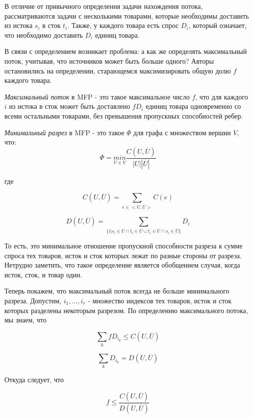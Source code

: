\documentclass[12pt]{article} %
\begin{document}
В отличие от привычного определения задачи нахождения потока, рассматриваются задачи с несколькими товарами, которые необходимы доставить из истока $s_i$ в сток $t_i$. Также, у каждого товара есть спрос $D_i$, который означает, что необходимо доставить $D_i$ единиц товара.

В связи с определением возникает проблема: а как же определять максимальный поток, учитывая, что источников может быть больше одного? Авторы остановились на определении, старающемся максимизировать общую долю $f$ каждого товара.

\begin{Def}
    \emph{Максимальный поток} в MFP - это такое максимальное число $f$, что для каждого $i$ из истока в сток может быть доставлено $f D_i$ единиц товара одновременно со всеми остальными товарами, без превышения пропускных способностей ребер.
\end{Def}

\begin{Def}
    \emph{Минимальный разрез} в MFP - это такое $\Phi$ для графа с множеством вершин $V$, что:
    $$\Phi = \underset{U \in V}{min} \frac{C(U, \overline{U})}{|U| |\overline{U}|}$$
    
    где
    
    $$C(U, \overline{U}) = \underset{e \in <U, \overline{U}>}{\sum} C(e)$$
    
    $$D(U, \overline{U}) = \underset{\{ i | s_i \in U \cap t_i \in \overline{U} \cup t_i \in U \cap s_i \in \overline{U} \}}{\sum} D_i$$
    
    То есть, это минимальное отношение пропускной способности разреза к сумме спроса тех товаров, исток и сток которых лежат по разные стороны от разреза. Нетрудно заметить, что такое определение является обобщением случая, когда исток, сток, и товар один.
\end{Def}

Теперь покажем, что максимальный поток всегда не больше минимального разреза. Допустим, $i_1, ... , i_r$ - множество индексов тех товаров, исток и сток которых разделены некоторым разрезом. По определению максимального потока, мы знаем, что

$$\underset{k}{\sum} f D_{i_k} \leq C(U, \overline{U})$$

$$\underset{k}{\sum} D_{i_k} = D(U, \overline{U})$$

Откуда следует, что

$$f \leq \frac{C(U, \overline{U})}{D(U, \overline{U})}$$

\end{document}
